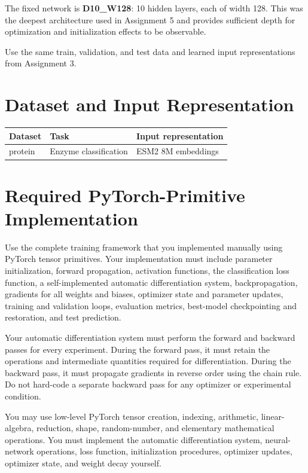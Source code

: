 \documentclass[11pt]{article}
\begin{document}
The fixed network is \textbf{D10\_W128}: 10 hidden layers, each of width 128. This was the deepest architecture used in Assignment 5 and provides sufficient depth for optimization and initialization effects to be observable.

Use the same train, validation, and test data and learned input representations from Assignment 3.

\section{Dataset and Input Representation}
\begin{center}
\begin{tabular}{lll}
\toprule
Dataset & Task & Input representation \\
\midrule
protein & Enzyme classification & ESM2 8M embeddings \\
\bottomrule
\end{tabular}
\end{center}

\section{Required PyTorch-Primitive Implementation}
Use the complete training framework that you implemented manually using PyTorch tensor primitives. Your implementation must include parameter initialization, forward propagation, activation functions, the classification loss function, a self-implemented automatic differentiation system, backpropagation, gradients for all weights and biases, optimizer state and parameter updates, training and validation loops, evaluation metrics, best-model checkpointing and restoration, and test prediction.

Your automatic differentiation system must perform the forward and backward passes for every experiment. During the forward pass, it must retain the operations and intermediate quantities required for differentiation. During the backward pass, it must propagate gradients in reverse order using the chain rule. Do not hard-code a separate backward pass for any optimizer or experimental condition.

You may use low-level PyTorch tensor creation, indexing, arithmetic, linear-algebra, reduction, shape, random-number, and elementary mathematical operations. You must implement the automatic differentiation system, neural-network operations, loss function, initialization procedures, optimizer updates, optimizer state, and weight decay yourself.
\end{document}
